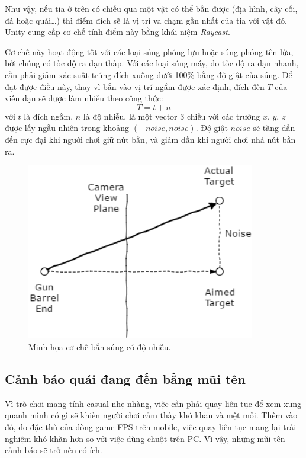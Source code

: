\documentclass[12pt]{report}
\begin{document}
Như vậy, nếu tia ở trên có chiếu qua một vật có thể bắn được (địa hình, cây cối, đá hoặc quái\ldots) thì điểm đích sẽ là vị trí va chạm gần nhất của tia với vật đó. Unity cung cấp cơ chế tính điểm này bằng khái niệm \textit{Raycast}.

Cơ chế này hoạt động tốt với các loại súng phóng lựu hoặc súng phóng tên lửa, bởi chúng có tốc độ ra đạn thấp. Với các loại súng máy, do tốc độ ra đạn nhanh, cần phải giảm xác suất trúng đích xuống dưới 100\% bằng độ giật của súng. Để đạt được điều này, thay vì bắn vào vị trí ngắm được xác định, đích đến $T$ của viên đạn sẽ được làm nhiễu theo công thức:
\[
T = t + n
\]
với $t$ là đích ngắm, $n$ là độ nhiễu, là một vector 3 chiều với các trường $x$, $y$, $z$ được lấy ngẫu nhiên trong khoảng $(-noise, noise)$. Độ giật $noise$ sẽ tăng dần đến cực đại khi người chơi giữ nút bắn, và giảm dần khi người chơi nhả nút bắn ra.

\begin{figure}[h]
  \centering
    \includegraphics[width=10cm]{Pics/Chap5/shootingmechanic.png}
  \caption{Minh họa cơ chế bắn súng có độ nhiễu.}
\end{figure}

\subsection{Cảnh báo quái đang đến bằng mũi tên}
Vì trò chơi mang tính casual nhẹ nhàng, việc cần phải quay liên tục để xem xung quanh mình có gì sẽ khiến người chơi cảm thấy khó khăn và mệt mỏi. Thêm vào đó, do đặc thù của dòng game FPS trên mobile, việc quay liên tục mang lại trải nghiệm khó khăn hơn so với việc dùng chuột trên PC. Vì vậy, những mũi tên cảnh báo sẽ trở nên có ích.
\end{document}
